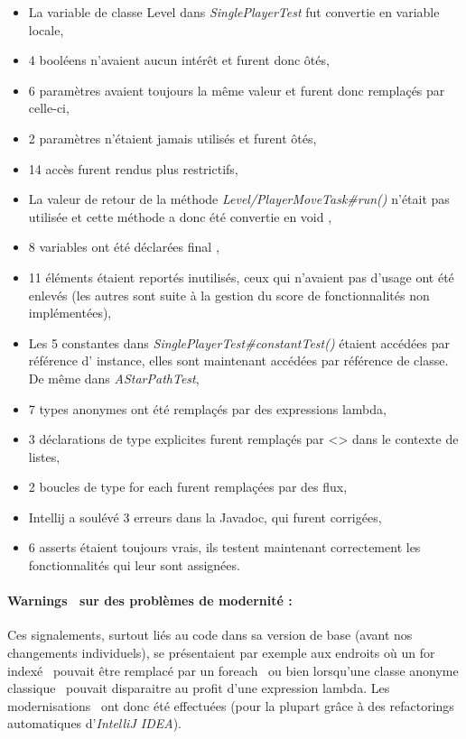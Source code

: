 \documentclass[12pt, openany]{report}
\begin{document}
\begin{itemize}
	\item La variable de classe \og Level \fg{} dans \mbox{\textit{SinglePlayerTest}} fut convertie en variable locale,
	\item 4 booléens n'avaient aucun intérêt et furent donc ôtés,
	\item 6 paramètres avaient toujours la même valeur et furent donc remplaçés par celle-ci,
	\item 2 paramètres n'étaient jamais utilisés et furent ôtés,
	\item 14 accès furent rendus plus restrictifs,
	\item La valeur de retour de la méthode \mbox{\textit{Level/PlayerMoveTask\#run()}} n'était pas utilisée et cette méthode a donc été convertie en \og void \fg{},
	\item 8 variables ont été déclarées \og final \fg{},
	\item 11 éléments étaient reportés inutilisés, ceux qui n'avaient pas d'usage ont été enlevés (les autres sont suite à la gestion du score de fonctionnalités non implémentées),
	\item Les 5 constantes dans \mbox{\textit{SinglePlayerTest\#constantTest()}} étaient accédées par référence d' instance, elles sont maintenant accédées par référence de classe. De même dans \mbox{\textit{AStarPathTest}},
	\item 7 types anonymes ont été remplaçés par des expressions lambda,
	\item 3 déclarations de type explicites furent remplaçés par \og <> \fg{} dans le contexte de listes,
	\item 2 boucles de type \og for each \fg{} furent remplaçées par des flux,
	\item Intellij a soulévé 3 erreurs dans la Javadoc, qui furent corrigées,
	\item 6 \og asserts \fg{} étaient toujours vrais, ils testent maintenant correctement les fonctionnalités qui leur sont assignées.
\end{itemize}
\paragraph{\og Warnings \fg \ sur des \og problèmes de modernité \fg : }
Ces signalements, surtout liés au code dans sa version de base (avant nos changements individuels), se présentaient par exemple aux endroits où un \og for indexé \fg \, pouvait être remplacé par un \og foreach \fg \, ou bien lorsqu'une classe anonyme \og classique \fg \, pouvait disparaitre au profit d'une expression lambda. Les \og modernisations \fg \, ont donc été effectuées (pour la plupart grâce à des \og refactorings \fg \, automatiques d'\textit{IntelliJ IDEA}).
\end{document}

